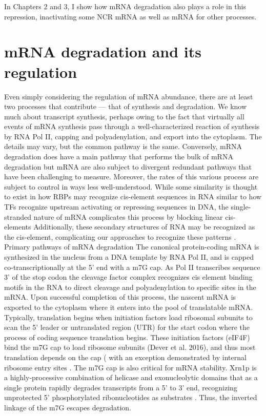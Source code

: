 In Chapters 2 and 3, I show how mRNA
degradation also plays a role in this repression, inactivating some
NCR mRNA as well as mRNA for other processes.

\section{mRNA degradation and its regulation}

Even simply considering the regulation of mRNA
abundance, there are at least two processes that contribute --- that
of synthesis and degradation. We know much about transcript synthesis,
perhaps owing to the fact that virtually all events of mRNA synthesis
pass through a well-characterized reaction of synthesis by RNA Pol II,
capping and polyadenylation, and export into the cytoplasm. The
details may vary, but the common pathway is the same. Conversely, mRNA
degradation does have a main pathway that performs the bulk of mRNA
degradation but mRNA are also subject to divergent redundant pathways
that have been challenging to measure. Moreover, the rates of this
various process are subject to control in ways less well-understood.
While some similarity is thought to exist in how RBPs may recognize
cis-element sequences in RNA similar to how TFs recognize upstream
activating or repressing sequences in DNA, the single-stranded
nature of mRNA complicates this process by blocking linear
cis-elements 
\parencite{li2010predicting}
Additionally, these secondary
structures of RNA may be recognized as the cis-element, complicating
our approaches to recognize these patterns
\parencite{goodarzi2012systematic}.
Primary pathways of mRNA degradation The canonical protein-coding mRNA
is synthesized in the nucleus from a DNA template by RNA Pol II, and
is capped co-transcriptionally at the 5’ end with a m7G cap. As Pol II
transcribes sequence 3’ of the stop codon the cleavage factor complex
recognizes cis element binding motifs in the RNA to direct cleavage
and polyadenylation to specific sites in the mRNA. Upon successful
completion of this process, the nascent mRNA is exported to the
cytoplasm where it enters into the pool of translatable mRNA.
Typically, translation begins when initiation factors load ribosomal
subunits to scan the 5’ leader or untranslated region (UTR) for the
start codon where the process of coding sequence translation begins.
These initiation factors (eIF4F) bind the m7G cap to load ribosome
subunits (Dever et al. 2016), and thus most translation depends on the
cap ( with an exception demonstrated by internal ribosome entry sites
\parencite{gilbert2007cap}.
The m7G cap is also critical for mRNA
stability. Xrn1p is a highly-processive combination of helicase and
exonucleolytic domains that as a single protein rapidly degrades
transcripts from a 5’ to 3’ end, recognizing unprotected 5’
phosphorylated ribonucleotides as substrates \parencite{parker2012rna}. Thus, the
inverted linkage of the m7G escapes degradation.  

